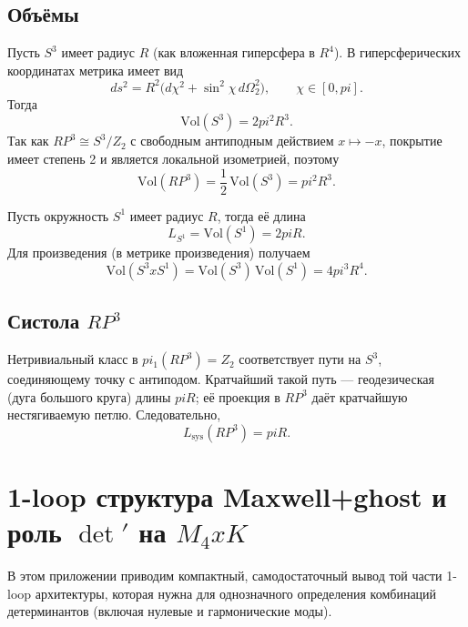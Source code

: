 \documentclass[12pt]{article}
\def\mathbb#1{#1}%
\def\pi{pi}%
\def\times{x}%
\begin{document}
\subsection{Объёмы}
Пусть $S^3$ имеет радиус $R$ (как вложенная гиперсфера в $\mathbb{R}^4$). В гиперсферических координатах метрика имеет вид
\begin{equation}
  ds^2=R^2\bigl(d\chi^2+\sin^2\chi\,d\Omega_2^2\bigr),\qquad \chi\in[0,\pi].
\end{equation}
Тогда
\begin{equation}
  \mathrm{Vol}(S^3)=2\pi^2R^3.
\end{equation}
Так как $\mathbb{RP}^3\cong S^3/\mathbb{Z}_2$ с свободным антиподным действием $x\mapsto -x$, покрытие имеет степень 2 и является локальной изометрией, поэтому
\begin{equation}
  \mathrm{Vol}(\mathbb{RP}^3)=\frac12\,\mathrm{Vol}(S^3)=\pi^2R^3.
\end{equation}

Пусть окружность $S^1$ имеет радиус $R$, тогда её длина
\begin{equation}
  L_{S^1}=\mathrm{Vol}(S^1)=2\pi R.
\end{equation}
Для произведения (в метрике произведения) получаем
\begin{equation}
  \mathrm{Vol}(S^3\times S^1)=\mathrm{Vol}(S^3)\,\mathrm{Vol}(S^1)=4\pi^3R^4.
\end{equation}

\subsection{Систола $\mathbb{RP}^3$}
Нетривиальный класс в $\pi_1(\mathbb{RP}^3)=\mathbb{Z}_2$ соответствует пути на $S^3$, соединяющему точку с антиподом.
Кратчайший такой путь --- геодезическая (дуга большого круга) длины $\pi R$; её проекция в $\mathbb{RP}^3$ даёт кратчайшую нестягиваемую петлю.
Следовательно,
\begin{equation}
  L_{\mathrm{sys}}(\mathbb{RP}^3)=\pi R.
\end{equation}

\section{1-loop структура Maxwell+ghost и роль $\det'$ на $M_4\times K$}
В этом приложении приводим компактный, самодостаточный вывод той части 1-loop архитектуры, которая нужна для однозначного определения комбинаций детерминантов (включая нулевые и гармонические моды).
\end{document}
